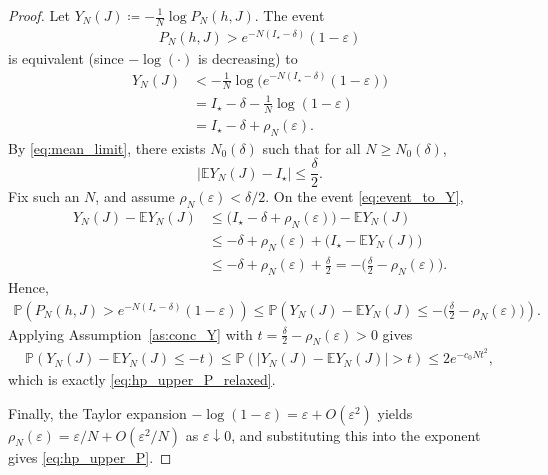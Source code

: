 \documentclass{article}
\theoremstyle{remark} %
\begin{document}
\begin{proof}
Let $Y_N(J)\coloneqq-\frac1N\log P_N(h,J)$. The event
\begin{align}
P_N(h,J) > e^{-N(I_\star-\delta)}(1-\varepsilon)
\end{align}
is equivalent (since $-\log(\cdot)$ is decreasing) to
\begin{align}
Y_N(J)
&< -\frac1N\log \Big(e^{-N(I_\star-\delta)}(1-\varepsilon)\Big)\nonumber\\
&= I_\star-\delta-\frac1N\log(1-\varepsilon)\nonumber\\
&= I_\star-\delta+\rho_N(\varepsilon).\label{eq:event_to_Y}
\end{align}
By \eqref{eq:mean_limit}, there exists $N_0(\delta)$ such that for all $N\ge N_0(\delta)$,
\begin{equation}\label{eq:mean_close_relaxed}
\big|\mathbb EY_N(J)-I_\star\big|\le \frac{\delta}{2}.
\end{equation}
Fix such an $N$, and assume $\rho_N(\varepsilon)<\delta/2$. On the event \eqref{eq:event_to_Y},
\begin{align}
Y_N(J)-\mathbb EY_N(J)
&\le \big(I_\star-\delta+\rho_N(\varepsilon)\big)-\mathbb EY_N(J)\\
&\le -\delta+\rho_N(\varepsilon)+\big(I_\star-\mathbb EY_N(J)\big)\\
&\le -\delta+\rho_N(\varepsilon)+\frac{\delta}{2}
= -\Big(\frac{\delta}{2}-\rho_N(\varepsilon)\Big).
\end{align}
Hence,
\begin{align}
\mathbb P \left(P_N(h,J) > e^{-N(I_\star-\delta)}(1-\varepsilon)\right)
\le
\mathbb P \left(Y_N(J)-\mathbb EY_N(J)\le -\Big(\frac{\delta}{2}-\rho_N(\varepsilon)\Big)\right).
\end{align}
Applying Assumption~\ref{as:conc_Y} with
$t=\frac{\delta}{2}-\rho_N(\varepsilon)>0$ gives
\begin{align}
\mathbb P \left(Y_N(J)-\mathbb EY_N(J)\le -t\right)
\le
\mathbb P \left(|Y_N(J)-\mathbb EY_N(J)|>t\right)
\le
2e^{-c_0Nt^2},
\end{align}
which is exactly \eqref{eq:hp_upper_P_relaxed}.

Finally, the Taylor expansion $-\log(1-\varepsilon)=\varepsilon+O(\varepsilon^2)$ yields
$\rho_N(\varepsilon)=\varepsilon/N+O(\varepsilon^2/N)$ as $\varepsilon\downarrow 0$, and substituting this into the exponent
gives \eqref{eq:hp_upper_P}.
\end{proof}
\end{document}
